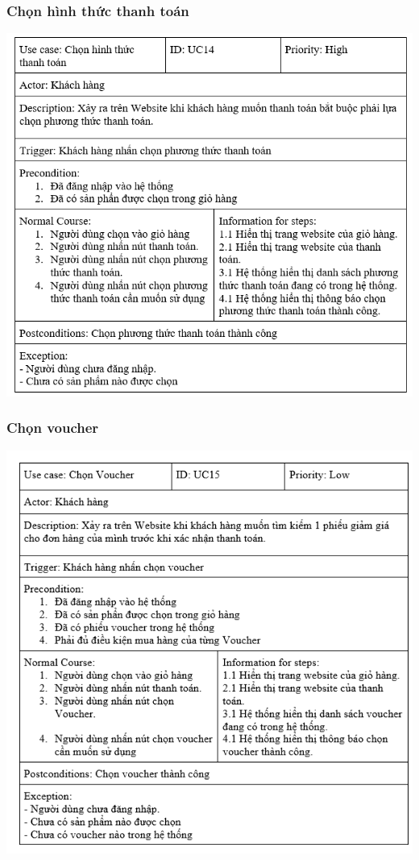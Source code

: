 \documentclass[12pt,a4paper,2sides]{report}
\begin{document}
\subsubsection{Chọn hình thức thanh toán}
    \includegraphics[width=1\linewidth]{lib/usecase/chonhttt.png}\\\vspace*{1cm}
\subsubsection{Chọn voucher}
    \includegraphics[width=1\linewidth]{lib/usecase/chonvoucher.png}\\\vspace*{1cm}
\end{document}
